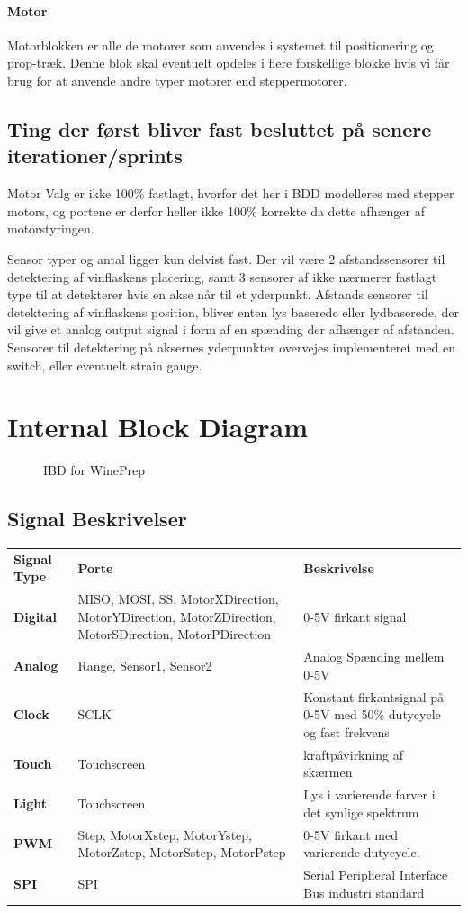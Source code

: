 \paragraph{Motor} Motorblokken er alle de motorer som anvendes i systemet til positionering og prop-træk. Denne blok skal eventuelt opdeles i flere forskellige blokke hvis vi får brug for at anvende andre typer motorer end steppermotorer.

\subsection{Ting der først bliver fast besluttet på senere iterationer/sprints}

Motor Valg er ikke 100\% fastlagt, hvorfor det her i BDD modelleres med stepper motors, og portene er derfor heller ikke 100\% korrekte da dette afhænger af motorstyringen.

Sensor typer og antal ligger kun delvist fast. Der vil være 2 afstandssensorer til detektering af vinflaskens placering, samt 3 sensorer af ikke nærmerer fastlagt type til at detekterer hvis en akse når til et yderpunkt. Afstands sensorer til detektering af vinflaskens position, bliver enten lys baserede eller lydbaserede, der vil give et analog output signal i form af en spænding der afhænger af afstanden. Sensorer til detektering på aksernes yderpunkter overvejes implementeret med en switch, eller eventuelt strain gauge.

\section{Internal Block Diagram}

\begin{figure}[H]
	\centering
	\caption{IBD for WinePrep}
	\label{IBD}
\end{figure}

\subsection{Signal Beskrivelser}

\begin{tabular}{>{\bfseries}p{50pt}  p{110pt}  p{170pt}}
	Signal Type & \textbf{Porte} & \textbf{Beskrivelse} \\
	Digital & MISO, MOSI, SS, MotorXDirection, MotorYDirection, MotorZDirection, MotorSDirection, MotorPDirection & 0-5V firkant signal \\
	Analog & Range, Sensor1, Sensor2 & Analog Spænding mellem 0-5V \\
	Clock & SCLK & Konstant firkantsignal på 0-5V med 50\% dutycycle og fast frekvens \\
	Touch & Touchscreen & kraftpåvirkning af skærmen \\
	Light & Touchscreen & Lys i varierende farver i det synlige spektrum \\
	PWM & Step, MotorXstep, MotorYstep, MotorZstep, MotorSstep, MotorPstep & 0-5V firkant med varierende dutycycle. \\
	SPI & SPI & Serial Peripheral Interface Bus industri standard \\
\end{tabular}